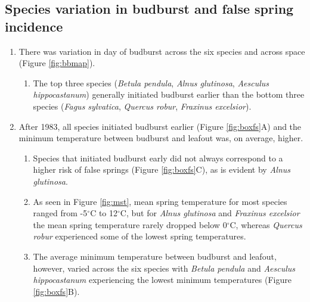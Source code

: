 \documentclass{article}\usepackage[]{graphicx}\usepackage[]{color}
\begin{document}
\subsection*{Species variation in budburst and false spring incidence}
\begin{enumerate}
\item There was variation in day of budburst across the six species and across space (Figure \ref{fig:bbmap}). 
\begin{enumerate}
\item The top three species (\textit{Betula pendula}, \textit{Alnus glutinosa}, \textit{Aesculus hippocastanum}) generally initiated budburst earlier than the bottom three species (\textit{Fagus sylvatica}, \textit{Quercus robur}, \textit{Fraxinus excelsior}).
\end{enumerate}

\item After 1983, all species initiated budburst earlier (Figure \ref{fig:boxfs}A) and the minimum temperature between budburst and leafout was, on average, higher. 
\begin{enumerate}
\item Species that initiated budburst early did not always correspond to a higher risk of false springs (Figure \ref{fig:boxfs}C), as is evident by \textit{Alnus glutinosa}.
\item As seen in Figure \ref{fig:mst}, mean spring temperature for most species ranged from -5$^{\circ}$C to 12$^{\circ}$C, but for \textit{Alnus glutinosa} and \textit{Fraxinus excelsior} the mean spring temperature rarely dropped below 0$^{\circ}$C, whereas \textit{Quercus robur} experienced some of the lowest spring temperatures.
\item The average minimum temperature between budburst and leafout, however, varied across the six species with \textit{Betula pendula} and \textit{Aesculus hippocastanum} experiencing the lowest minimum temperatures (Figure \ref{fig:boxfs}B). 
\end{enumerate}
\end{enumerate}
\end{document}
